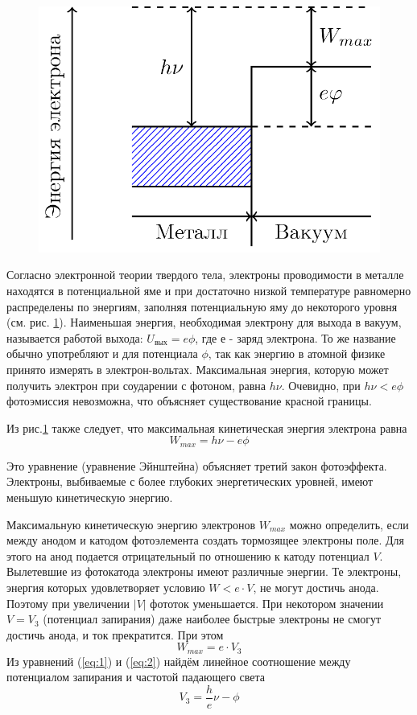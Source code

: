 \begin{figure}[]
	\centering
	\includegraphics[width = 0.5\linewidth]{fig/fig1}
	\caption{}
	\label{fig:1}
\end{figure}
Согласно электронной теории твердого тела, электроны проводимости в металле находятся в потенциальной яме и при достаточно низкой температуре равномерно распределены по энергиям, заполняя потенциальную яму до некоторого уровня (см. рис. \ref{fig:1}).
Наименьшая энергия, необходимая электрону для выхода в вакуум, называется работой выхода: $U_{\text{вых}} = e\phi$, где $е$ - заряд электрона. То же название обычно употребляют и для потенциала $\phi$, так как энергию в атомной физике принято измерять в электрон-вольтах. Максимальная энергия, которую может получить электрон при соударении с фотоном, равна $h \nu$. Очевидно, при $h \nu<e\phi$ фотоэмиссия невозможна, что объясняет существование красной границы.

Из рис.\ref{fig:1} также следует, что максимальная кинетическая энергия электрона равна
\begin{equation}
	\label{eq:1}
 	W_{max}=h \nu -e\phi
 \end{equation} 

Это уравнение (уравнение Эйнштейна) объясняет третий закон
фотоэффекта. Электроны, выбиваемые с более глубоких энергетических уровней, имеют меньшую кинетическую энергию.

Максимальную кинетическую энергию электронов $W_{max}$ можно определить, если между анодом и катодом фотоэлемента создать тормозящее электроны поле. Для этого на анод подается отрицательный по отношению к катоду потенциал $V$. Вылетевшие из фотокатода электроны имеют различные энергии. Те электроны, энергия которых удовлетворяет условию $W < e\cdot V$, не могут достичь анода. Поэтому при увеличении $ |V|$ фототок уменьшается. При некотором значении $V = V_{3}$ (потенциал запирания) даже наиболее быстрые электроны не смогут достичь анода, и ток прекратится. При этом
\begin{equation}
	\label{eq:2}
	W_{max}=e\cdot V_{3}
\end{equation}
Из уравнений (\ref{eq:1}) и (\ref{eq:2}) найдём линейное соотношение между потенциалом запирания и частотой падающего света
\begin{equation}
	\label{eq:3}
	V_{3}=\frac he \nu-\phi
\end{equation}

